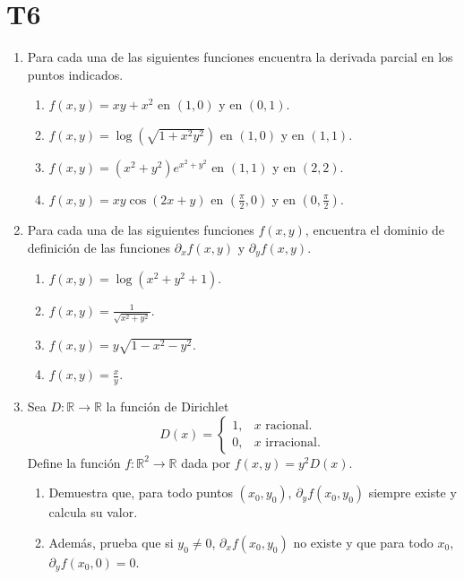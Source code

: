 \documentclass{article}
\theoremstyle{definition}
\begin{document}
  \section*{T6 }

  \begin{enumerate}

       \item Para cada una de las siguientes funciones encuentra la derivada parcial en los puntos indicados.
       \begin{enumerate}
       \item $f(x,y)=xy+x^2$ en $(1,0)$ y en $(0,1)$.
       \item $f(x,y)=\log(\sqrt{1+x^2y^2})$ en $(1,0)$ y en $(1,1)$.
       \item $f(x,y)=(x^2+y^2)e^{x^2+y^2}$ en $(1,1)$ y en $(2,2)$.
       \item $f(x,y)=xy\cos(2x+y)$ en $(\frac{\pi}{2},0)$ y en $(0,\frac{\pi}{2})$.
       \end{enumerate}
       

     \item Para cada una de las siguientes funciones $f(x,y)$, encuentra el dominio de definici\'on
       de las funciones $\partial_xf(x,y)$ y $\partial_yf(x,y)$.

       \begin{enumerate}
       \item $f(x,y)=\log(x^2+y^2+1)$.
       \item $f(x,y)=\frac{1}{\sqrt{x^2+y^2}}$.
       \item $f(x,y)=y\sqrt{1-x^2-y^2}$.
         \item $f(x,y)=\frac{x}{y}$.
       \end{enumerate}


       
     \item Sea $D:\mathbb{R}\to \mathbb{R}$ la funci\'on de Dirichlet
		$$
		D(x)=\left\{
		\begin{array}{cc}
		1, & \textrm{$x$ racional.}\\
		0, & \textrm{$x$ irracional.}
		\end{array}
		\right.	
		$$
       Define la funci\'on $f:\mathbb{R}^2 \to \mathbb{R}$ dada por $f(x,y)=y^2D(x)$.
       
       \begin{enumerate}
       \item Demuestra que, para todo puntos $(x_0,y_0)$, $\partial_yf(x_0,y_0)$ siempre existe y calcula su valor.
       \item Adem\'as, prueba que si $y_0\ne 0$, $\partial_xf(x_0,y_0)$ no existe y que para todo
       $x_0$, $\partial_yf(x_0,0)=0$. 
       \end{enumerate}


\end{enumerate}
\end{document}
